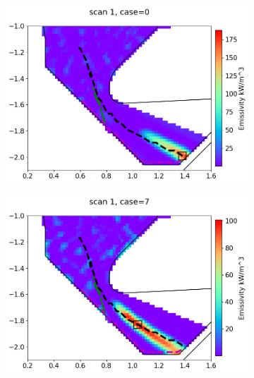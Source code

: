 \begin{figure}[!ht]
     \begin{subfigure}{0.33\linewidth}
         \centering
         \includegraphics[trim={10 0 25 35},clip,width=\textwidth]{Chapters/chapter2/figs/phantom_example1.png}
         \caption{}
         \label{fig:scan1a}
     \end{subfigure}
     \hfill
     \begin{subfigure}{0.31\linewidth}
         \centering
         \includegraphics[trim={50 0 25 35},clip,width=\textwidth]{Chapters/chapter2/figs/phantom_example2.png}
         \caption{}
         \label{fig:scan1b}
     \end{subfigure}
     \hfill
     \begin{subfigure}{0.32\linewidth}

\end{subfigure}
\end{figure}
